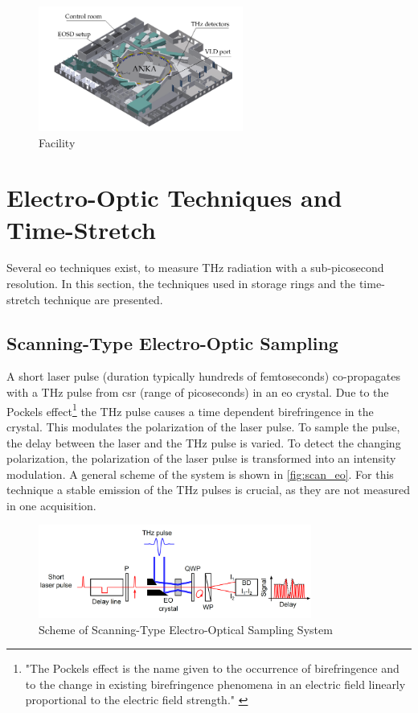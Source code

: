 \begin{figure}[H]
	\centering
	\includegraphics[width = 0.6\textwidth]{chap/02-theory/img/kara.png}
	\caption{Facility \cite{rota2018}}
	\label{fig:kara}
\end{figure}

\newpage 
\section{Electro-Optic Techniques and Time-Stretch}
Several \gls{eo} techniques exist, to measure THz radiation with a sub-picosecond resolution.
In this section, the techniques used in storage rings and the time-stretch technique are presented. 

\subsection{Scanning-Type Electro-Optic Sampling}
A short laser pulse (duration typically hundreds of femtoseconds) co-propagates with a THz pulse from \gls{csr} (range of picoseconds) in an \gls{eo} crystal. Due to the Pockels effect\footnote{"The Pockels effect is the name given to the occurrence of
birefringence and to the change in existing birefringence phenomena in an electric field linearly proportional to the electric
field strength." \cite{pockels}} the THz pulse causes a time dependent birefringence in the crystal.
This modulates the polarization of the laser pulse.
To sample the pulse, the delay between the laser and the THz pulse is varied.
To detect the changing polarization, the polarization of the laser pulse is transformed into an intensity modulation.
A general scheme of the system is shown in \autoref{fig:scan_eo}.
For this technique a stable emission of the THz pulses is crucial, as they are not measured in one acquisition. \cite{roussel2014}
\begin{figure}[H]
	\centering
	\includegraphics[width = 0.8\textwidth]{chap/02-theory/img/scanning_eo}
	\caption{Scheme of Scanning-Type Electro-Optical Sampling System \cite{roussel2014}}
	\label{fig:scan_eo}
\end{figure}

